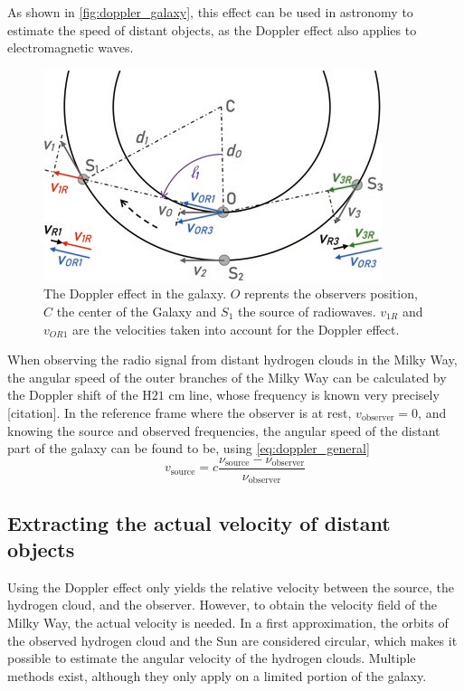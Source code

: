 As shown in \autoref{fig:doppler_galaxy}, this effect can be used in astronomy to estimate the speed of distant objects, as the Doppler effect also applies to electromagnetic waves.
\begin{figure}[htbp]
    \centering
    \includegraphics[width=0.6\linewidth]{figures/doppler_galaxy.png}
    \caption{The Doppler effect in the galaxy. $O$ reprents the observers position, $C$ the center of the Galaxy and $S_1$ the source of radiowaves. $v_{1R}$ and $v_{OR1}$ are the velocities taken into account for the Doppler effect. \cite{lauterbach_radio_2022}}
    \label{fig:doppler_galaxy}
\end{figure}
When observing the radio signal from distant hydrogen clouds in the Milky Way, the angular speed of the outer branches of the Milky Way can be calculated by the Doppler shift of the H$21$ cm line, whose frequency is known very precisely [citation].
In the reference frame where the observer is at rest, $v_\textrm{observer} = 0$, and knowing the source and observed frequencies, the angular speed of the distant part of the galaxy can be found to be, using \autoref{eq:doppler_general}
\begin{equation}
    v_\textrm{source} = c \frac{\nu_\textrm{source} - \nu_\textrm{observer}}{\nu_\textrm{observer}}
    \label{eq:doppler}
\end{equation}

\subsection{Extracting the actual velocity of distant objects}
Using the Doppler effect only yields the relative velocity between the source, the hydrogen cloud, and the observer. However, to obtain the velocity field of the Milky Way, the actual velocity is needed. In a first approximation, the orbits of the observed hydrogen cloud and the Sun are considered circular, which makes it possible to estimate the angular velocity of the hydrogen clouds. Multiple methods exist, although they only apply on a limited portion of the galaxy.

